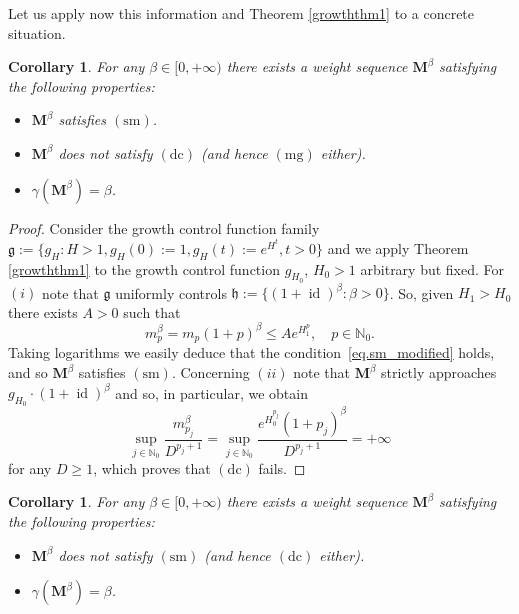 \documentclass[12pt,a4paper]{article}
\newcommand{\N}{\mathbb{N}}
\newcommand{\id}{\operatorname{id}}
\newcommand{\dc}{\operatorname{(dc)}}
\newcommand{\mg}{\operatorname{(mg)}}
\newcommand{\sm}{\operatorname{(sm)}}
\theoremstyle{plain}
\newtheorem{corollary}[theorem]{Corollary}
\theoremstyle{definition}
\numberwithin{equation}{section}
\begin{document}
Let us apply now this information and Theorem \ref{growththm1} to a concrete situation.

\begin{corollary}\label{growthcounterexample}
For any $\beta\in[0,+\infty)$ there exists a weight sequence $\boldsymbol{M}^{\beta}$ satisfying the following properties:
\begin{itemize}
\item[$(i)$] $\boldsymbol{M}^{\beta}$ satisfies $\sm$.

\item[$(ii)$] $\boldsymbol{M}^{\beta}$ does not satisfy  $\dc$ (and hence $\mg$ either).

\item[$(iii)$] $\gamma(\boldsymbol{M}^{\beta})=\beta$.
\end{itemize}
\end{corollary}

\begin{proof}
Consider the growth control function family $\mathfrak{g}:=\{g_H: H>1, g_H(0):=1, g_H(t):=e^{H^t}, t>0\}$ and we apply Theorem \ref{growththm1} to the growth control function $g_{H_0}$, $H_0>1$ arbitrary but fixed. For $(i)$ note that $\mathfrak{g}$ uniformly controls $\mathfrak{h}:=\{(1+\id)^{\beta}: \beta>0\}$. So, given $H_1>H_0$ there exists $A>0$ such that
$$
m_p^{\beta}=m_p(1+p)^{\beta}\le Ae^{H_1^p},\quad p\in\N_0.
$$
Taking logarithms we easily deduce that the condition~\eqref{eq.sm_modified} holds, and so $\boldsymbol{M}^{\beta}$ satisfies $\sm$.
Concerning $(ii)$ note that $\boldsymbol{M}^{\beta}$ strictly approaches $g_{H_0}\cdot(1+\id)^{\beta}$ and so, in particular, we obtain
$$
\sup_{j\in\mathbb{N}_0}\frac{m^{\beta}_{p_j}}{D^{p_j+1}}
=\sup_{j\in\mathbb{N}_0} \frac{e^{H_0^{p_j}}(1+p_j)^{\beta}}{D^{p_j+1}}=+\infty
$$
for any $D\ge 1$, which proves that $\dc$ fails.
\end{proof}

\begin{corollary}\label{growthcounterexample2}
For any $\beta\in[0,+\infty)$ there exists a weight sequence $\boldsymbol{M}^{\beta}$ satisfying the following properties:
\begin{itemize}
\item[$(i)$] $\boldsymbol{M}^{\beta}$ does not satisfy $\sm$ (and hence $\dc$ either).

\item[$(ii)$] $\gamma(\boldsymbol{M}^{\beta})=\beta$.
\end{itemize}
\end{corollary}
\end{document}
